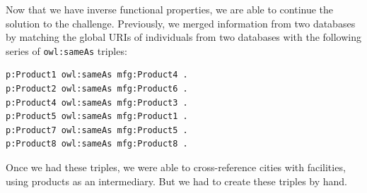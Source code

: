 Now that we have inverse functional properties, we are able to continue
the solution to the challenge. Previously, we merged information from
two databases by matching the global URIs of individuals from two
databases with the following series of \texttt{owl:sameAs} triples:

\begin{lstlisting}
p:Product1 owl:sameAs mfg:Product4 .
p:Product2 owl:sameAs mfg:Product6 .
p:Product4 owl:sameAs mfg:Product3 .
p:Product5 owl:sameAs mfg:Product1 .
p:Product7 owl:sameAs mfg:Product5 .
p:Product8 owl:sameAs mfg:Product8 .
\end{lstlisting}

Once we had these triples, we were able to cross-reference cities with
facilities, using products as an intermediary. But we had to create
these triples by hand.

